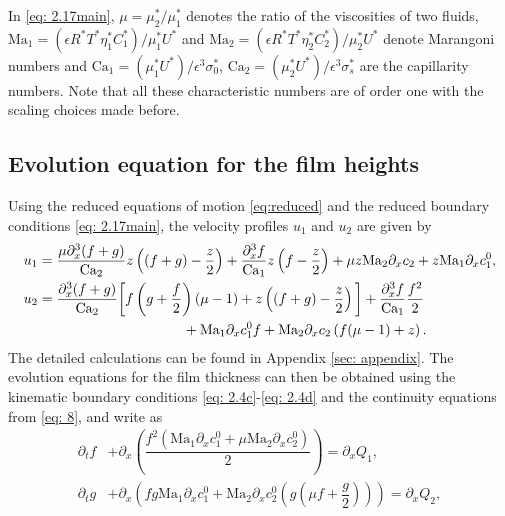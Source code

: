 \documentclass[11pt]{article}
\numberwithin{equation}{section}
\newtheorem{counter example}[theorem]{Counter Example}
\begin{document}
{In \eqref{eq: 2.17main}, $\mu=\mu_2^*/\mu_1^*$ denotes the ratio of the viscosities of two fluids, $\mathrm{Ma_1}=(\epsilon R^* T^* \eta_1^* C_1^*)/\mu_1^* U^*$ and $\mathrm{Ma_2}=(\epsilon R^* T^* \eta_2^* C_2^*)/\mu_2^* U^*$ denote Marangoni numbers and $\mathrm{Ca_1}=(\mu_1^* U^*)/\epsilon^3 \sigma_{0}^*$, $\mathrm{Ca_2}=(\mu_2^* U^*)/\epsilon^3 \sigma_{s}^*$ are the capillarity numbers. Note that all these characteristic numbers are of order one with the scaling choices made before. 

\subsection{Evolution equation for the film heights}
Using the reduced equations of motion \eqref{eq:reduced} and the reduced boundary conditions \eqref{eq: 2.17main}, the velocity profiles $u_1$ and $u_2$ are given by
\begin{align}
   &u_1=\dfrac{\mu \partial_{x}^3(f+g)}{\mathrm{Ca_2}}z\left((f+g)-\dfrac{z}{2}\right)+\dfrac{\partial_{x}^3 f}{\mathrm{Ca_1}}z\left(f-\dfrac{z}{2}\right)+\mu z\mathrm{Ma_2}\partial_x c_2 +z\mathrm{Ma_1} \partial_x c_1^0,\label{eq: 2.18main} \\
&u_2=\dfrac{\partial_{x}^3(f+g)}{\mathrm{Ca_2}}\bigg[f\left(g+\dfrac{f}{2}\right)(\mu-1)+z\left((f+g)-\dfrac{z}{2}\right)\bigg]+\dfrac{\partial_{x}^3 f}{\mathrm{Ca_1}}\dfrac{f^2}{2}\label{eq: 2.6a_velocity_2}\\
&\hspace{4 cm}+\mathrm{Ma_1}  \partial_x c_1^0 f+\mathrm{Ma_2}\partial_x c_2\left(f(\mu-1)+z\right).\nonumber
\end{align}
The detailed calculations can be found in Appendix \ref{sec: appendix}. The evolution equations for the film thickness can then be obtained using the kinematic boundary conditions \eqref{eq: 2.4c}-\eqref{eq: 2.4d} and the continuity equations from \eqref{eq: 8}, and write as
\begin{align}\label{eq: 2.24main}
   \partial_t f&+\partial_x \left(\dfrac{f^2(\mathrm{Ma_1} \partial_x c_1^0+\mu \mathrm{Ma_2}\partial_x c_2^0)}{2}\right)=\partial_x Q_1,\\
    \partial_t g&+\partial_x\left(fg\mathrm{Ma_1} \partial_x c_1^0+\mathrm{Ma_2}\partial_x c_2^0\left(g\left(\mu f+\dfrac{g}{2}\right)\right)\right)=\partial_x Q_2,\label{eq: 2.24second}

\end{align}}
\end{document}
